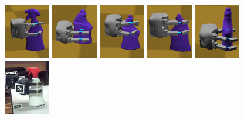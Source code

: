 \begin{figure}[!!hbt]
\begin{center}
{ \includegraphics[width=0.18\textwidth]     {images/ssoch/fig/spray_full_P1}    \label{spray_full_P1}}
{ \includegraphics[width=0.18\textwidth]     {images/ssoch/fig/spray_P1}    \label{spray_P1}}
{ \includegraphics[width=0.18\textwidth]     {images/ssoch/fig/spray_P2}    \label{spray_P2}}
{ \includegraphics[width=0.18\textwidth]     {images/ssoch/fig/spray_P3}    \label{spray_P3}}
{ \includegraphics[width=0.18\textwidth]     {images/ssoch/fig/spray_P4}    \label{spray_P4}}
{ \includegraphics[width=0.18\textwidth]     {images/ssoch/fig/spray_full_p1}    \label{spray_full_p1}}

\end{center}
\end{figure}
